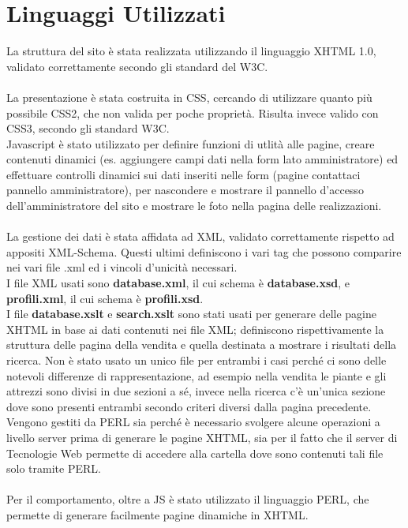 \section{Linguaggi Utilizzati}{
	La struttura del sito è stata realizzata utilizzando il linguaggio XHTML 1.0, validato correttamente secondo gli standard del W3C. \\
	\\
	La presentazione è stata costruita in CSS, cercando di utilizzare quanto più possibile CSS2, che non valida per poche proprietà. Risulta invece valido con CSS3, secondo gli standard W3C.
	\\
	Javascript è stato utilizzato per definire funzioni di utlità alle pagine, creare contenuti dinamici (es. aggiungere campi dati nella form lato amministratore) ed effettuare controlli dinamici sui dati inseriti nelle form (pagine contattaci pannello amministratore), per nascondere e mostrare il pannello d'accesso dell'amministratore del sito e mostrare le foto nella pagina delle realizzazioni.\\
	\\
	La gestione dei dati è stata affidata ad XML, validato correttamente rispetto ad appositi XML-Schema. Questi ultimi definiscono i vari tag che possono comparire nei vari file .xml ed i vincoli d'unicità necessari. \\
	I file XML usati sono \textbf{database.xml}, il cui schema è \textbf{database.xsd}, e \textbf{profili.xml}, il cui schema è \textbf{profili.xsd}.\\
	I file \textbf{database.xslt} e \textbf{search.xslt} sono stati usati per generare delle pagine XHTML in base ai dati contenuti nei file XML; definiscono rispettivamente la struttura delle pagina della vendita e quella destinata a mostrare i risultati della ricerca. Non è stato usato un unico file per entrambi i casi perché ci sono delle notevoli differenze di rappresentazione, ad esempio nella vendita le piante e gli attrezzi sono divisi in due sezioni a sé, invece nella ricerca c'è un'unica sezione dove sono presenti entrambi secondo criteri diversi dalla pagina precedente.
	Vengono gestiti da PERL sia perché è necessario svolgere alcune operazioni a livello server prima di generare le pagine XHTML, sia per il fatto che il server di Tecnologie Web permette di accedere alla cartella dove sono contenuti tali file solo tramite PERL.\\
	\\
	Per il comportamento, oltre a JS è stato utilizzato il linguaggio PERL, che permette di generare facilmente pagine dinamiche in XHTML.\\ 
}
